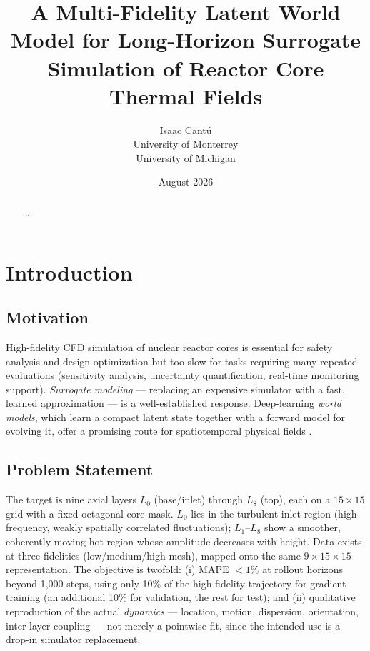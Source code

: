 \documentclass[11pt]{article}
\title{\textbf{A Multi-Fidelity Latent World Model for Long-Horizon Surrogate Simulation of Reactor Core Thermal Fields}}
\author{
Isaac Cantú\\
University of Monterrey\\
University of Michigan
}
\date{August 2026}
\begin{document}
\maketitle

\begin{abstract}
...
\end{abstract}

\tableofcontents

\section{Introduction}
\subsection{Motivation}
High-fidelity CFD simulation of nuclear reactor cores is essential for safety analysis and design optimization but too slow for tasks requiring many repeated evaluations (sensitivity analysis, uncertainty quantification, real-time monitoring support). \emph{Surrogate modeling} — replacing an expensive simulator with a fast, learned approximation — is a well-established response. Deep-learning \emph{world models}, which learn a compact latent state together with a forward model for evolving it, offer a promising route for spatiotemporal physical fields \cite{kim2024glide}.

\subsection{Problem Statement}
The target is nine axial layers $L_0$ (base/inlet) through $L_8$ (top), each on a $15\times15$ grid with a fixed octagonal core mask. $L_0$ lies in the turbulent inlet region (high-frequency, weakly spatially correlated fluctuations); $L_1$–$L_8$ show a smoother, coherently moving hot region whose amplitude decreases with height. Data exists at three fidelities (low/medium/high mesh), mapped onto the same $9{\times}15{\times}15$ representation. The objective is twofold: (i) MAPE $<1\%$ at rollout horizons beyond 1{,}000 steps, using only 10\% of the high-fidelity trajectory for gradient training (an additional 10\% for validation, the rest for test); and (ii) qualitative reproduction of the actual \emph{dynamics} — location, motion, dispersion, orientation, inter-layer coupling — not merely a pointwise fit, since the intended use is a drop-in simulator replacement.
\end{document}
